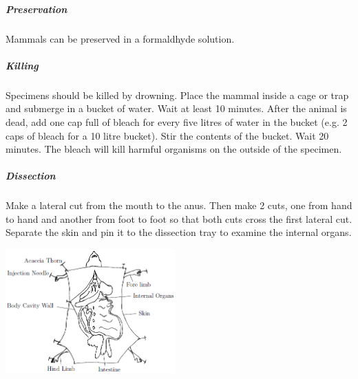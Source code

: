 \begin{multicols}{2}
%

\subparagraph{Preservation} 
Mammals can be preserved in a formaldhyde solution.

\subparagraph{Killing}
Specimens should be killed by drowning. Place the mammal inside a cage or trap and submerge in a bucket of water. Wait at least 10 minutes. After the animal is dead, add one cap full of bleach for every five litres of water in the bucket (e.g. 2 caps of bleach for a 10 litre bucket). Stir the contents of the bucket. Wait 20 minutes. The bleach will kill harmful organisms on the outside of the specimen.

\subparagraph{Dissection}
Make a lateral cut from the mouth to the anus. Then make 2 cuts, one from hand to hand and another from foot to foot so that both cuts cross the first lateral cut. Separate the skin and pin it to the dissection tray to examine the internal organs.

\begin{center}
\includegraphics[width=0.49\textwidth]{./img/dissection-rat.png}
\end{center}

\end{multicols}

\setcounter{secnumdepth}{2}